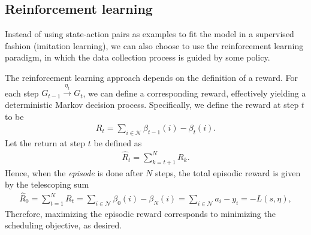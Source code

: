\documentclass[a4paper]{article}
\theoremstyle{definition}
\theoremstyle{plain}
\begin{document}
\subsection{Reinforcement learning}

Instead of using state-action pairs as examples to fit the model in a supervised
fashion (imitation learning), we can also choose to use the reinforcement
learning paradigm, in which the data collection process is guided by some
policy.

The reinforcement learning approach depends on the definition of a reward. For
each step $G_{t-1} \xrightarrow{\eta_{t}} G_{t}$, we can define a corresponding
reward, effectively yielding a deterministic Markov decision process.
Specifically, we define the reward at step $t$ to be
\begin{align*}
  R_{t} = \sum_{i \in \mathcal{N}} \beta_{t-1}(i) - \beta_{t}(i) .
\end{align*}
Let the return at step $t$ be defined as
\begin{align*}
  \hat{R}_{t} = \sum_{k=t + 1}^{N} R_{k} .
\end{align*}
Hence, when the \textit{episode} is done after $N$ steps, the total episodic
reward is given by the telescoping sum
\begin{align*}
  \hat{R}_{0} = \sum_{t=1}^{N} R_{t} = \sum_{i \in \mathcal{N}} \beta_{0}(i) - \beta_{N}(i)  = \sum_{i \in \mathcal{N}} a_{i} - y_{i} = - L(s, \eta) ,
\end{align*}
Therefore, maximizing the episodic reward corresponds to minimizing the
scheduling objective, as desired.
%
\end{document}
